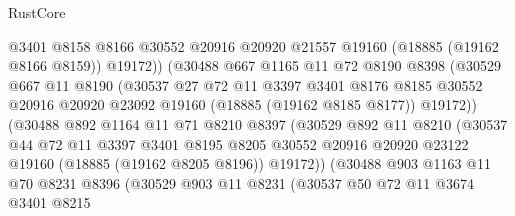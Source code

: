\begin{lexlean}{RustCore}
\begin{coremodule}
                        @3401
                        @8158
                        @8166
                        @30552
                        @20916
                        @20920
                        @21557
                        @19160
                        (@18885 (@19162 @8166 @8159))
                        @19172))
                    (@30488
                      @667
                      @1165
                      @11
                      @72
                      @8190
                      @8398
                      (@30529
                        @667
                        @11
                        @8190
                        (@30537
                          @27
                          @72
                          @11
                          @3397
                          @3401
                          @8176
                          @8185
                          @30552
                          @20916
                          @20920
                          @23092
                          @19160
                          (@18885 (@19162 @8185 @8177))
                          @19172))
                      (@30488
                        @892
                        @1164
                        @11
                        @71
                        @8210
                        @8397
                        (@30529
                          @892
                          @11
                          @8210
                          (@30537
                            @44
                            @72
                            @11
                            @3397
                            @3401
                            @8195
                            @8205
                            @30552
                            @20916
                            @20920
                            @23122
                            @19160
                            (@18885 (@19162 @8205 @8196))
                            @19172))
                        (@30488
                          @903
                          @1163
                          @11
                          @70
                          @8231
                          @8396
                          (@30529
                            @903
                            @11
                            @8231
                            (@30537
                              @50
                              @72
                              @11
                              @3674
                              @3401
                              @8215

\end{coremodule}
\end{lexlean}
